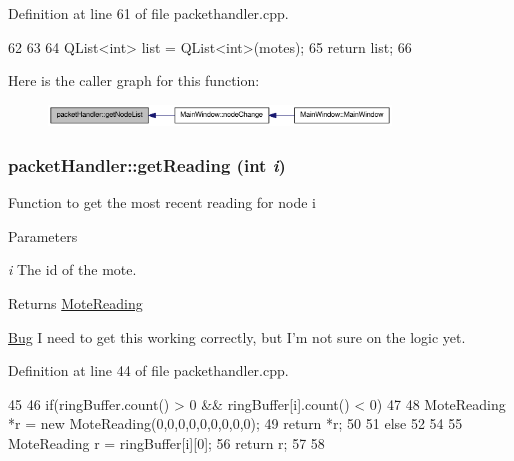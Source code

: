 Definition at line 61 of file packethandler.cpp.




\begin{DoxyCode}
62 {
63 
64     QList<int> list = QList<int>(motes);
65     return list;
66 }
\end{DoxyCode}




Here is the caller graph for this function:\nopagebreak
\begin{figure}[H]
\begin{center}
\leavevmode
\includegraphics[width=258pt]{classpacketHandler_a7d07166d577b014234ad311599ac3291_icgraph}
\end{center}
\end{figure}


\hypertarget{classpacketHandler_aec6fa94602daa18227491b76001152cb}{
\subsubsection[{getReading}]{ packetHandler::getReading (int {\em i})}}
\label{classpacketHandler_aec6fa94602daa18227491b76001152cb}
Function to get the most recent reading for node i 
\begin{DoxyParams}{Parameters}
\item[{\em i}]The id of the mote. \end{DoxyParams}
\begin{DoxyReturn}{Returns}
\hyperlink{classMoteReading}{MoteReading} 
\end{DoxyReturn}


\begin{Desc}
\item[\hyperlink{bug__bug000001}{Bug}]I need to get this working correctly, but I'm not sure on the logic yet. \end{Desc}




Definition at line 44 of file packethandler.cpp.




\begin{DoxyCode}
45 {
46         if(ringBuffer.count() > 0 && ringBuffer[i].count() < 0)
47     {
48         MoteReading *r = new MoteReading(0,0,0,0,0,0,0,0,0);
49         return *r;
50     }
51     else
52     {
54 
55         MoteReading r = ringBuffer[i][0];
56     return r;
57     }
58 }
\end{DoxyCode}




